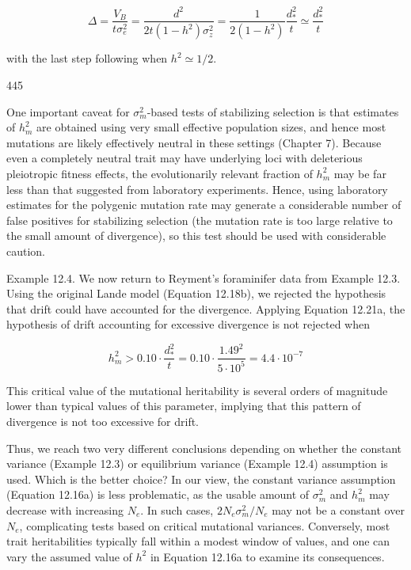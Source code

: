 \documentclass{article}
\begin{document}
\begin{equation}
\Delta=\frac{V_{B}}{t\sigma_{e}^{2}}=\frac{d^{2}}{2t(1-h^{2})\sigma_{z}^{2}}=\frac{1}{2(1-h^{2})}\frac{d_{*}^{2}}{t}\simeq\frac{d_{*}^{2}}{t}
\tag{12.21c}
\label{eq:12_21c}
\end{equation}

with the last step following when  $ h^2 \simeq 1/2 $.

445

One important caveat for  $ \sigma_m^2 $-based tests of stabilizing selection is that estimates of  $ h_m^2 $ are obtained using very small effective population sizes, and hence most mutations are likely effectively neutral in these settings (Chapter 7). Because even a completely neutral trait may have underlying loci with deleterious pleiotropic fitness effects, the evolutionarily relevant fraction of  $ h_m^2 $ may be far less than that suggested from laboratory experiments. Hence, using laboratory estimates for the polygenic mutation rate may generate a considerable number of false positives for stabilizing selection (the mutation rate is too large relative to the small amount of divergence), so this test should be used with considerable caution.

Example 12.4. We now return to Reyment's foraminifer data from Example 12.3. Using the original Lande model (Equation 12.18b), we rejected the hypothesis that drift could have accounted for the divergence. Applying Equation 12.21a, the hypothesis of drift accounting for excessive divergence is not rejected when

\begin{equation}
h_{m}^{2}>0.10\cdot\frac{d_{*}^{2}}{t}=0.10\cdot\frac{1.49^{2}}{5\cdot10^{5}}=4.4\cdot10^{-7}
\end{equation}

This critical value of the mutational heritability is several orders of magnitude lower than typical values of this parameter, implying that this pattern of divergence is not too excessive for drift.

Thus, we reach two very different conclusions depending on whether the constant variance (Example 12.3) or equilibrium variance (Example 12.4) assumption is used. Which is the better choice? In our view, the constant variance assumption (Equation 12.16a) is less problematic, as the usable amount of  $ \sigma_m^2 $ and  $ h_m^2 $ may decrease with increasing  $ N_e $. In such cases,  $ 2N_e\sigma_m^2/N_e $ may not be a constant over  $ N_e $, complicating tests based on critical mutational variances. Conversely, most trait heritabilities typically fall within a modest window of values, and one can vary the assumed value of  $ h^2 $ in Equation 12.16a to examine its consequences.
\end{document}
